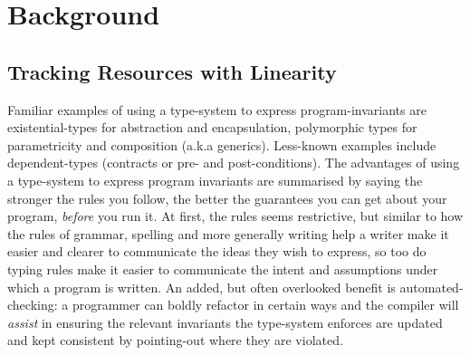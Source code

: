 \chapter{Background}

%

%

\section{Tracking Resources with Linearity}
Familiar examples of using a type-system to express program-invariants are
existential-types for abstraction and encapsulation, polymorphic types for
parametricity and composition (a.k.a generics). Less-known examples include
dependent-types (contracts or pre- and post-conditions). The advantages of
using a type-system to express program invariants are summarised by saying the
stronger the rules you follow, the better the guarantees you can get about your
program, \emph{before} you run it. At first, the rules seems restrictive, but
similar to how the rules of grammar, spelling and more generally writing help a
writer make it easier and clearer to communicate the ideas they wish to express,
so too do typing rules make it easier to communicate the intent and
assumptions under which a program is written. An added, but often overlooked
benefit is automated-checking: a programmer can boldly refactor in certain
ways and the compiler will \emph{assist} in ensuring the relevant invariants
the type-system enforces are updated and kept consistent by pointing-out
where they are violated.

